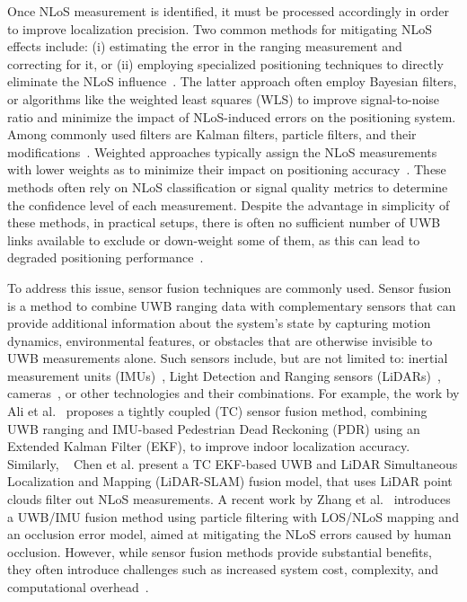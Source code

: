Once NLoS measurement is identified, it must be processed accordingly in order to improve localization precision. Two common methods for mitigating NLoS effects include: (i) estimating the error in the ranging measurement and correcting for it, or (ii) employing specialized positioning techniques to directly eliminate the NLoS influence~\cite{yu2018novel}. The latter approach often employ Bayesian filters, or algorithms like the weighted least squares (WLS) to improve signal-to-noise ratio and minimize the impact of NLoS-induced errors on the positioning system. Among commonly used filters are Kalman filters, particle filters, and their modifications~\cite{Wang2023NLoS}. Weighted approaches typically assign the NLoS measurements with lower weights as to minimize their impact on positioning accuracy~\cite{Wang2023NLoS}. These methods often rely on NLoS classification or signal quality metrics to determine the confidence level of each measurement. Despite the advantage in simplicity of these methods, in practical setups, there is often no sufficient number of UWB links available to exclude or down-weight some of them, as this can lead to degraded positioning performance~\cite{ferreira2021feature}. 

To address this issue, sensor fusion techniques are commonly used. Sensor fusion is a method to combine UWB ranging data with complementary sensors that can provide additional information about the system's state by capturing motion dynamics, environmental features, or obstacles that are otherwise invisible to UWB measurements alone.  Such sensors include, but are not limited to:  inertial measurement units (IMUs)~\cite{Kim2021IMU}, Light Detection and Ranging sensors (LiDARs)~\cite{Chen2022LIDAR}, cameras~\cite{Peng2022Visual}, or other technologies and their combinations. For example, the work by Ali et al.~\cite{Ali2021IMU} proposes a tightly coupled (TC) sensor fusion method, combining UWB ranging and IMU-based Pedestrian Dead Reckoning (PDR) using an Extended Kalman Filter (EKF), to improve indoor localization accuracy. Similarly, ~\cite{Chen2022LIDAR} Chen et al. present a TC EKF-based UWB and LiDAR Simultaneous Localization and Mapping (LiDAR-SLAM) fusion model, that uses LiDAR point clouds filter out NLoS measurements. A recent work by Zhang et al.~\cite{zhang2023research} introduces a UWB/IMU fusion method using particle filtering with LOS/NLoS mapping and an occlusion error model, aimed at mitigating the NLoS errors caused by human occlusion. However, while sensor fusion methods provide substantial benefits, they often introduce challenges such as increased system cost, complexity, and computational overhead~\cite{Naheem2022IMU, wang2024comprehensive}.

